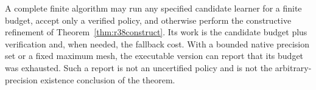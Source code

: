 A complete finite algorithm may run any specified candidate learner for a
finite budget, accept only a verified policy, and otherwise perform the
constructive refinement of Theorem~\ref{thm:r38construct}. Its work is the
candidate budget plus verification and, when needed, the fallback cost.
With a bounded native precision set or a fixed maximum mesh, the executable
version can report that its budget was exhausted. Such a report is not an
uncertified policy and is not the arbitrary-precision existence conclusion
of the theorem.
